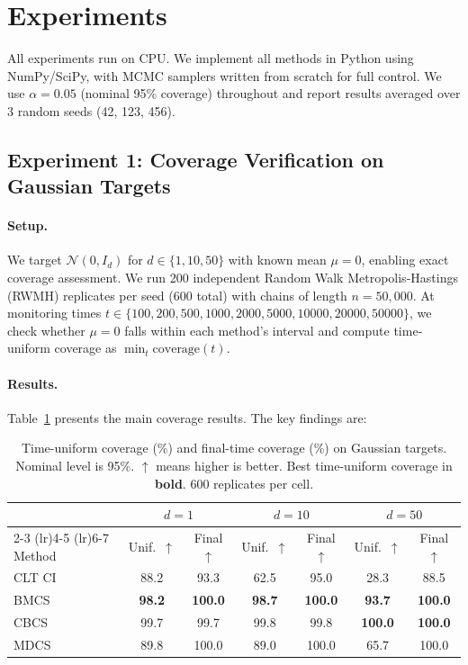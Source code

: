 \documentclass[11pt]{article}
\newcommand{\N}{\mathcal{N}}
\begin{document}
\section{Experiments}
\label{sec:experiments}

All experiments run on CPU. We implement all methods in Python using NumPy/SciPy, with MCMC samplers written from scratch for full control. We use $\alpha = 0.05$ (nominal 95\% coverage) throughout and report results averaged over 3 random seeds (42, 123, 456).

\subsection{Experiment 1: Coverage Verification on Gaussian Targets}

\paragraph{Setup.} We target $\N(0, I_d)$ for $d \in \{1, 10, 50\}$ with known mean $\mu = 0$, enabling exact coverage assessment. We run 200 independent Random Walk Metropolis-Hastings (RWMH) replicates per seed (600 total) with chains of length $n = 50{,}000$. At monitoring times $t \in \{100, 200, 500, 1000, 2000, 5000, 10000, 20000, 50000\}$, we check whether $\mu = 0$ falls within each method's interval and compute time-uniform coverage as $\min_t \text{coverage}(t)$.

\paragraph{Results.} Table~\ref{tab:coverage} presents the main coverage results. The key findings are:

\begin{table}[t]
\caption{Time-uniform coverage (\%) and final-time coverage (\%) on Gaussian targets. Nominal level is 95\%. $\uparrow$ means higher is better. Best time-uniform coverage in \textbf{bold}. 600 replicates per cell.}
\label{tab:coverage}
\centering
\begin{tabular}{lcccccc}
\toprule
& \multicolumn{2}{c}{$d=1$} & \multicolumn{2}{c}{$d=10$} & \multicolumn{2}{c}{$d=50$} \\
\cmidrule(lr){2-3} \cmidrule(lr){4-5} \cmidrule(lr){6-7}
Method & Unif.\ $\uparrow$ & Final $\uparrow$ & Unif.\ $\uparrow$ & Final $\uparrow$ & Unif.\ $\uparrow$ & Final $\uparrow$ \\
\midrule
CLT CI     & 88.2 & 93.3 & 62.5 & 95.0 & 28.3 & 88.5 \\
BMCS       & \textbf{98.2} & \textbf{100.0} & \textbf{98.7} & \textbf{100.0} & \textbf{93.7} & \textbf{100.0} \\
CBCS       & 99.7 & 99.7 & 99.8 & 99.8 & \textbf{100.0} & \textbf{100.0} \\
MDCS       & 89.8 & 100.0 & 89.0 & 100.0 & 65.7 & 100.0 \\
\bottomrule
\end{tabular}
\end{table}
\end{document}
